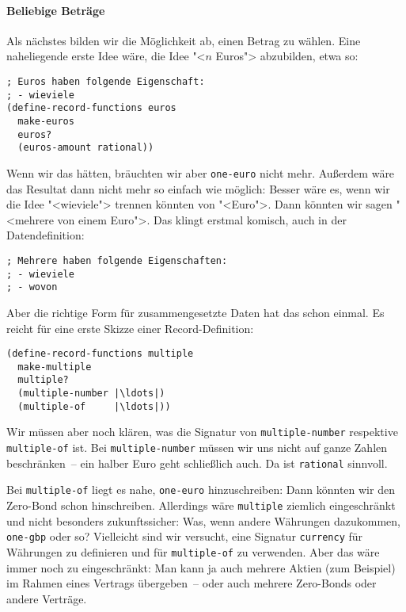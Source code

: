 \paragraph{Beliebige Beträge}
Als nächstes bilden wir die Möglichkeit ab, einen Betrag zu wählen.
Eine naheliegende erste Idee wäre, die Idee "<$n$ Euros"> abzubilden,
etwa so:
%
\begin{lstlisting}
; Euros haben folgende Eigenschaft:
; - wieviele
(define-record-functions euros
  make-euros
  euros?
  (euros-amount rational))
\end{lstlisting}
%
Wenn wir das hätten, bräuchten wir aber \lstinline{one-euro} nicht mehr.
Außerdem wäre das Resultat dann nicht mehr so einfach wie möglich:
Besser wäre es, wenn wir die Idee "<wieviele"> trennen könnten von
"<Euro">.  Dann könnten wir sagen "<mehrere von einem Euro">.  Das
klingt erstmal komisch, auch in der Datendefinition:
%
\begin{lstlisting}
; Mehrere haben folgende Eigenschaften:
; - wieviele
; - wovon
\end{lstlisting}
%
Aber die richtige Form für zusammengesetzte Daten hat das schon
einmal.  Es reicht für eine erste Skizze einer Record-Definition:
%
\begin{lstlisting}
(define-record-functions multiple
  make-multiple
  multiple?
  (multiple-number |\ldots|)
  (multiple-of     |\ldots|))
\end{lstlisting}
%
Wir müssen aber noch klären, was die Signatur von
\lstinline{multiple-number} respektive \lstinline{multiple-of} ist.
Bei \lstinline{multiple-number} müssen wir uns nicht auf ganze Zahlen
beschränken~-- ein halber Euro geht schließlich auch.  Da ist
\lstinline{rational} sinnvoll.

Bei \lstinline{multiple-of} liegt es nahe, \lstinline{one-euro}
hinzuschreiben: Dann könnten wir den Zero-Bond schon hinschreiben.
Allerdings wäre \lstinline{multiple} ziemlich eingeschränkt und nicht
besonders zukunftssicher: Was, wenn andere Währungen dazukommen,
\lstinline{one-gbp} oder so?  Vielleicht sind wir versucht, eine
Signatur \lstinline{currency} für Währungen zu definieren und für
\lstinline{multiple-of} zu verwenden.  Aber das wäre immer noch zu
eingeschränkt: Man kann ja auch mehrere Aktien (zum Beispiel) im
Rahmen eines Vertrags übergeben~-- oder auch mehrere Zero-Bonds oder
andere Verträge.

